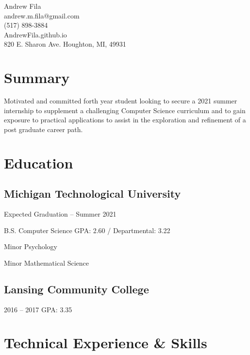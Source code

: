 \documentclass{article}
\begin{document}
\begin{center}
{\huge Andrew Fila}\\
    \faEnvelope \hspace{.05in}andrew.m.fila@gmail.com\\
    \faPhone \hspace{.05in} (517) 898-3884\\
    \faGlobe \hspace{.05in} AndrewFila.github.io\\
    \faMapMarker \hspace{.05in} 820 E. Sharon Ave. Houghton, MI, 49931
\end{center}

\section{Summary}
Motivated and committed forth year student looking to secure a 2021 summer internship to supplement a challenging Computer Science curriculum and to gain exposure to practical applications to assist in the exploration and refinement of a post graduate career path.


\section{Education}
\subsection{Michigan Technological University} \hfill Expected Graduation -- Summer 2021

B.S. Computer Science \hfill GPA: 2.60 / Departmental: 3.22

Minor Psychology

Minor Mathematical Science

\subsection{Lansing Community College}\hfill

2016 -- 2017 \hfill GPA: 3.35

\section{Technical Experience \& Skills}
\end{document}
